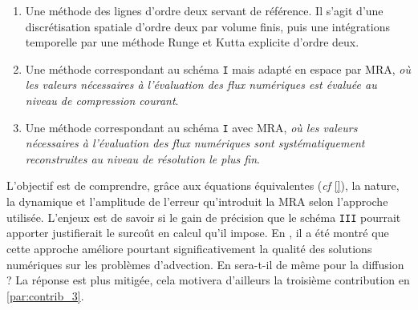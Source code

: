 \begin{enumerate}
    \renewcommand{\labelenumi}{\Roman{enumi}.}
    \item Une méthode des lignes d'ordre deux servant de référence. Il s'agit d'une discrétisation spatiale d'ordre deux par volume finis, 
    puis une intégrations temporelle par une méthode Runge et Kutta explicite d'ordre deux.
    \item Une méthode correspondant au schéma \texttt{I} mais adapté en espace par MRA, \emph{où les valeurs nécessaires à l'évaluation des flux numériques 
    est évaluée au niveau de compression courant}.
    \item Une méthode correspondant au schéma \texttt{I} avec MRA, \emph{où les valeurs nécessaires à l'évaluation des flux numériques 
    sont systématiquement reconstruites au niveau de résolution le plus fin}.
\end{enumerate}
L'objectif est de comprendre, grâce aux équations équivalentes (\emph{cf} \ref{}), la nature, la dynamique et l’amplitude de l'erreur qu'introduit la MRA selon l'approche utilisée.
L'enjeux est de savoir si le gain de précision que le schéma \texttt{III} pourrait apporter justifierait le surcoût en calcul qu'il impose.
En \cite{belloti_et_al_2025,Massot2025_meshAdaptation}, il a été montré que cette approche améliore pourtant significativement la qualité des solutions numériques sur les problèmes d'advection.
En sera-t-il de même pour la diffusion ? La réponse est plus mitigée, cela motivera d'ailleurs la troisième contribution en \ref{par:contrib_3}.
